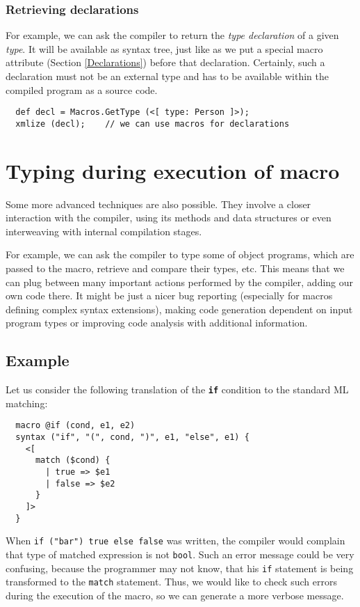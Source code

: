 \documentclass{llncs}
\newcommand{\kw}[1]{{\tt \bf #1}}
\begin{document}
\subsubsection{Retrieving declarations}
For example, we can ask the compiler to return the \emph{type declaration} 
of a given \emph{type}. It will be available as syntax tree, just like 
as we put a special macro attribute (Section \ref{Declarations}) before that 
declaration.
Certainly, such a declaration must not be an external type 
and has to be available within the compiled program as a source code.

\begin{verbatim}
  def decl = Macros.GetType (<[ type: Person ]>);
  xmlize (decl);    // we can use macros for declarations
\end{verbatim}

\section{Typing during execution of macro}
Some more advanced techniques are also possible. They involve a closer
interaction with the compiler, using its methods and data structures
or even interweaving with internal compilation stages.

For example, we can ask the compiler to type some of object programs,
which are passed to the macro, retrieve and compare their types, etc.
This means that we can plug between many important actions performed by 
the compiler, adding our own code there. It might be just a nicer 
bug reporting (especially for macros defining complex syntax extensions), 
making code generation dependent on input program types or improving
code analysis with additional information.

\newpage
\subsection{Example}
Let us consider the following translation of the \kw{if} condition to the standard
ML matching:

\begin{verbatim}
  macro @if (cond, e1, e2)
  syntax ("if", "(", cond, ")", e1, "else", e1) {
    <[ 
      match ($cond) {
        | true => $e1
        | false => $e2
      }       
    ]>
  }
\end{verbatim} %

When \verb,if ("bar") true else false, was written, the compiler would complain
that type of matched expression is not \verb,bool,. Such an error 
message could be very confusing, because the programmer may not know, that his 
\verb,if, statement is being transformed to the \verb,match, statement. Thus, 
we would like to check such errors during the execution of the macro, so we can
generate a more verbose message.
\end{document}
